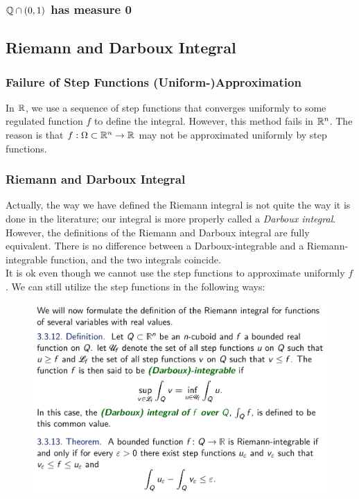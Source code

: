 \documentclass[12pt, t]{beamer}
\renewcommand{\emph}[1]{{\color{Turquoise3}\textsl{#1}}}
\newcommand{\nullspace}{~\\[15pt]}
\begin{document}
\begin{frame}
    \frametitle{$\mathbb{Q}\cap (0,1)$ has measure 0}


\end{frame}

\subsection{Riemann and Darboux Integral}
\begin{frame}
    \frametitle{Failure of Step Functions (Uniform-)Approximation}
    In $\mathbb{R}$, we use a sequence of step functions that converges uniformly to some regulated function $f$ to define the integral. However, this method fails in $\mathbb{R}^n$. The reason is that $f:\Omega\subset\mathbb{R}^n\to\mathbb{R}$  may not be approximated uniformly by step functions.
\end{frame}

\begin{frame}[allowframebreaks]
    \frametitle{Riemann and Darboux Integral}

    Actually, the way we have defined the Riemann integral is not quite
    the way it is done in the literature; our integral is more properly
    called a \emph{Darboux integral}. However, the definitions of the Riemann
    and Darboux integral are fully equivalent. There is no difference
    between a Darboux-integrable and a Riemann-integrable function,
    and the two integrals coincide.
    \nullspace
    It is ok even though we cannot use the step functions to approximate uniformly $f$. We can still utilize the step functions in the following ways:
    \newpage
    \begin{figure}[H]
        \centering
        \includegraphics[width=\textwidth]{2020-07-01-11-14-48.png}
    \end{figure}
\end{frame}
\end{document}

